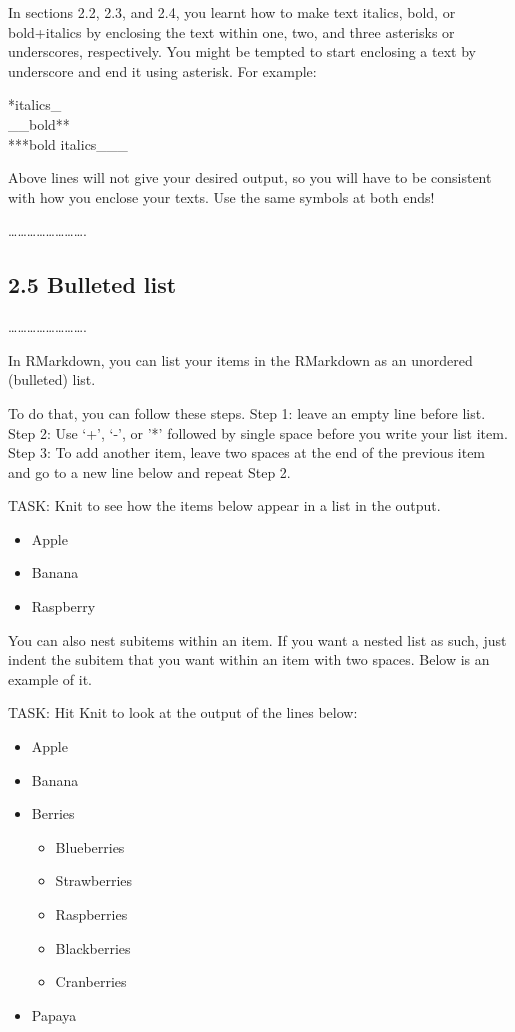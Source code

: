 \documentclass[
]{article}
\providecommand{\tightlist}{%
  \setlength{\itemsep}{0pt}\setlength{\parskip}{0pt}}
\begin{document}
\hfill\break

In sections 2.2, 2.3, and 2.4, you learnt how to make text italics,
bold, or bold+italics by enclosing the text within one, two, and three
asterisks or underscores, respectively. You might be tempted to start
enclosing a text by underscore and end it using asterisk. For example:

*italics\_\\
\_\_bold**\\
***bold italics\_\_\_

Above lines will not give your desired output, so you will have to be
consistent with how you enclose your texts. Use the same symbols at both
ends!

\ldots\ldots\ldots\ldots\ldots\ldots\ldots\ldots.

\subsection{2.5 Bulleted list}\label{bulleted-list}

\ldots\ldots\ldots\ldots\ldots\ldots\ldots\ldots.

In RMarkdown, you can list your items in the RMarkdown as an unordered
(bulleted) list.

To do that, you can follow these steps. Step 1: leave an empty line
before list. Step 2: Use `+', `-', or '*' followed by single space
before you write your list item.\\
Step 3: To add another item, leave two spaces at the end of the previous
item and go to a new line below and repeat Step 2.

TASK: Knit to see how the items below appear in a list in the output.

\begin{itemize}
\tightlist
\item
  Apple
\item
  Banana
\item
  Raspberry
\end{itemize}

You can also nest subitems within an item. If you want a nested list as
such, just indent the subitem that you want within an item with two
spaces. Below is an example of it.

TASK: Hit Knit to look at the output of the lines below:

\begin{itemize}
\tightlist
\item
  Apple
\item
  Banana
\item
  Berries

  \begin{itemize}
  \tightlist
  \item
    Blueberries
  \item
    Strawberries
  \item
    Raspberries
  \item
    Blackberries
  \item
    Cranberries
  \end{itemize}
\item
  Papaya
\end{itemize}
\end{document}
